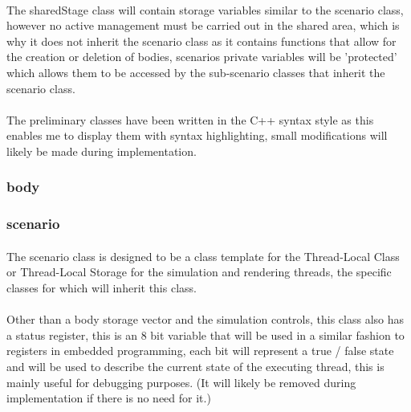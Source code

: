 \paragraph{}
The sharedStage class will contain storage variables similar to the scenario class, however no active management must be carried out in the shared area, which is why it does not inherit the scenario class as it contains functions that allow for the creation or deletion of bodies, scenarios private variables will be 'protected' which allows them to be accessed by the sub-scenario classes that inherit the scenario class.

\paragraph{}
The preliminary classes have been written in the C++ syntax style as this enables me to display them with syntax highlighting, small modifications will likely be made during implementation.

\pagebreak
\subsubsection{body}
\texttt{} 

\pagebreak
\subsubsection{scenario}
\texttt{}
\paragraph{}
The scenario class is designed to be a class template for the Thread-Local Class or Thread-Local Storage for the simulation and rendering threads, the specific classes for which will inherit this class.

\paragraph{}
Other than a body storage vector and the simulation controls, this class also has a status register, this is an 8 bit variable that will be used in a similar fashion to registers in embedded programming, each bit will represent a true / false state and will be used to describe the current state of the executing thread, this is mainly useful for debugging purposes. (It will likely be removed during implementation if there is no need for it.)

